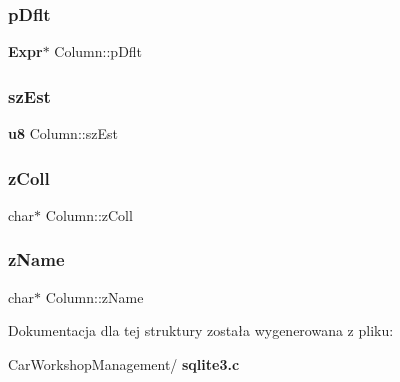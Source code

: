 \mbox{\label{struct_column_ac4178f302df70048235660979f84ffe4}} 
\subsubsection{pDflt}
{\footnotesize\ttfamily \textbf{ Expr}$\ast$ Column\+::p\+Dflt}

\mbox{\label{struct_column_a6d28f0023e550ea38ad2ab544942114d}} 
\subsubsection{szEst}
{\footnotesize\ttfamily \textbf{ u8} Column\+::sz\+Est}

\mbox{\label{struct_column_aa95909d5c77b321258622ed28d7b96eb}} 
\subsubsection{zColl}
{\footnotesize\ttfamily char$\ast$ Column\+::z\+Coll}

\mbox{\label{struct_column_a6450a4e9fde68b3a2d79425d826eccc3}} 
\subsubsection{zName}
{\footnotesize\ttfamily char$\ast$ Column\+::z\+Name}



Dokumentacja dla tej struktury została wygenerowana z pliku\+:\begin{DoxyCompactItemize}
\item 
Car\+Workshop\+Management/\textbf{ sqlite3.\+c}\end{DoxyCompactItemize}
